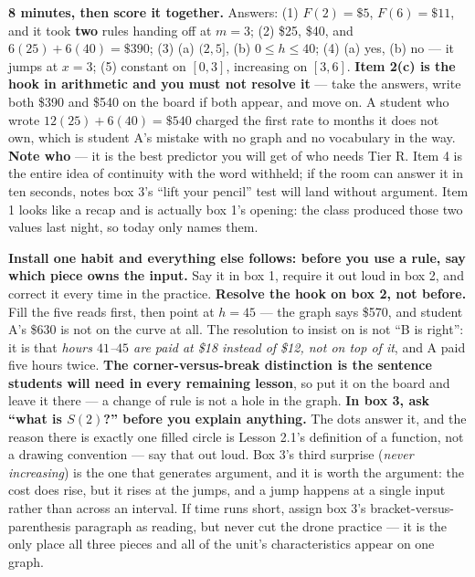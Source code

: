 \documentclass[10pt]{article}
\begin{document}
\boxguard[18]
\begin{teachernote}[Warm-Up]
    \textbf{8 minutes, then score it together.} Answers: (1) $F(2)=\$5$, $F(6)=\$11$, and it took
    \textbf{two} rules handing off at $m=3$; (2) \$25, \$40, and $6(25)+6(40)=\$390$; (3)
    (a) $(2,5]$, (b) $0 \le h \le 40$; (4) (a) yes, (b) no --- it jumps at $x=3$; (5) constant on
    $[0,3]$, increasing on $[3,6]$. \textbf{Item 2(c) is the hook in arithmetic and you must not
    resolve it} --- take the answers, write both \$390 and \$540 on the board if both appear, and move
    on. A student who wrote $12(25)+6(40)=\$540$ charged the first rate to months it does not own,
    which is student A's mistake with no graph and no vocabulary in the way. \textbf{Note who} --- it
    is the best predictor you will get of who needs Tier R. Item 4 is the entire idea of continuity
    with the word withheld; if the room can answer it in ten seconds, notes box 3's ``lift your
    pencil'' test will land without argument. Item 1 looks like a recap and is actually box 1's
    opening: the class produced those two values last night, so today only names them.
\end{teachernote}

\boxguard[18]
\begin{teachernote}
    \textbf{Install one habit and everything else follows: before you use a rule, say which piece owns
    the input.} Say it in box 1, require it out loud in box 2, and correct it every time in the
    practice. \textbf{Resolve the hook on box 2, not before.} Fill the five reads first, then point at
    $h=45$ --- the graph says \$570, and student A's \$630 is not on the curve at all. The resolution
    to insist on is not ``B is right'': it is that \emph{hours $41$--$45$ are paid at \$18 instead of
    \$12, not on top of it}, and A paid five hours twice. \textbf{The corner-versus-break distinction
    is the sentence students will need in every remaining lesson}, so put it on the board and leave it
    there --- a change of rule is not a hole in the graph. \textbf{In box 3, ask ``what is $S(2)$?''
    before you explain anything.} The dots answer it, and the reason there is exactly one filled circle
    is Lesson 2.1's definition of a function, not a drawing convention --- say that out loud. Box 3's
    third surprise (\emph{never increasing}) is the one that generates argument, and it is worth the
    argument: the cost does rise, but it rises at the jumps, and a jump happens at a single input
    rather than across an interval. If time runs short, assign box 3's bracket-versus-parenthesis
    paragraph as reading, but never cut the drone practice --- it is the only place all three pieces
    and all of the unit's characteristics appear on one graph.
\end{teachernote}
\end{document}
